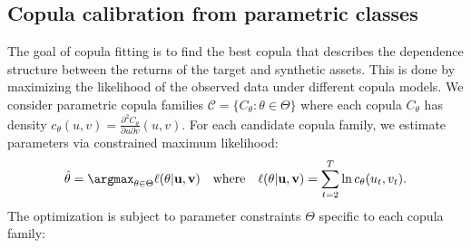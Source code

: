 \subsection{Copula calibration from parametric classes}

The goal of copula fitting is to find the best copula that describes the dependence structure between the returns of the target and synthetic assets. This is done by maximizing the likelihood of the observed data under different copula models. 
We consider parametric copula families $\mathcal{C} = \{C_\theta : \theta \in \Theta\}$ where each copula $C_\theta$ has density
$
c_\theta(u,v) = \frac{\partial^2 C_\theta}{\partial u \partial v}(u,v)
.
$
For each candidate copula family, we estimate parameters via constrained maximum likelihood:
%
\begin{equation} \label{eq:mle}
\hat{\theta} = \argmax_{\theta \in \Theta} \ell(\theta | \mbf {u,v}) \quad \text{where} \quad 
\ell(\theta| \mbf {u,v}) = \sum_{t=2}^T \ln c_\theta(u_t, v_t)
.
\end{equation}
%
The optimization is subject to parameter constraints $\Theta$ specific to each copula family:

